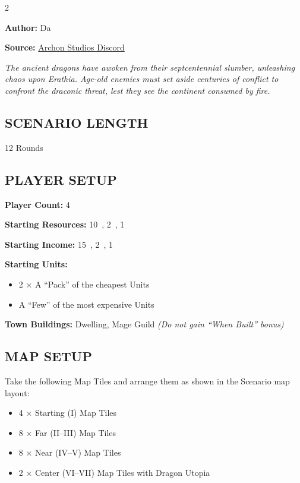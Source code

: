 
\begin{multicols}{2}

\textbf{Author:} Da

\textbf{Source:} \href{https://discord.com/channels/740870068178649108/1161571991732625468}{Archon Studios Discord}

\textit{The ancient dragons have awoken from their septcentennial slumber, unleashing chaos upon Erathia. Age-old enemies must set aside centuries of conflict to confront the draconic threat, lest they see the continent consumed by fire.}  %

\subsection*{\MakeUppercase{Scenario Length}}
12 Rounds

\subsection*{\MakeUppercase{Player Setup}}
\textbf{Player Count:} 4

\textbf{Starting Resources:} 10~, 2~, 1~

\textbf{Starting Income:} 15~, 2~, 1~

\textbf{Starting Units:}

\begin{itemize}
  \item 2 × A ``Pack'' of the cheapest  Units
  \item A ``Few'' of the most expensive  Units
\end{itemize}

\textbf{Town Buildings:}  Dwelling, Mage Guild \textit{(Do not gain ``When Built'' bonus)}

\subsection*{\MakeUppercase{Map Setup}}
Take the following Map Tiles and arrange them as shown in the Scenario map layout:

\begin{itemize}
  \item 4 × Starting (I) Map Tiles
  \item 8 × Far (II–III) Map Tiles
  \item 8 × Near (IV–V) Map Tiles
  \item 2 × Center (VI–VII) Map Tiles with Dragon Utopia
\end{itemize}


\end{multicols}
